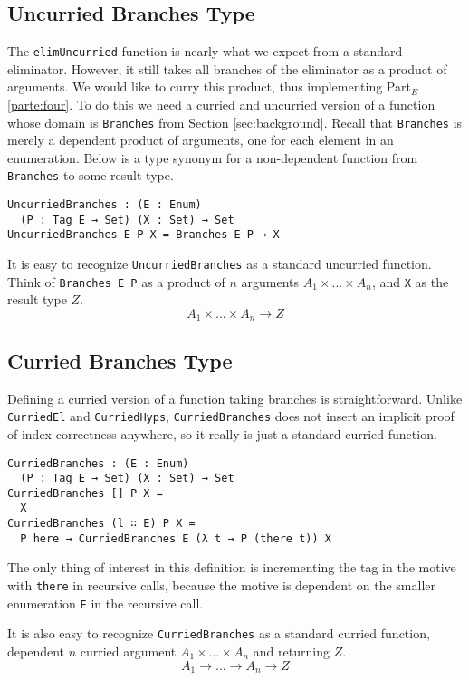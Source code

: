 \documentclass[preprint,nonatbib]{sigplanconf}
\newcommand{\refsec}[1]{Section \ref{sec:#1}}
\newcommand{\refparte}[1]{Part$_E$ \ref{parte:#1}}
\begin{document}
\subsection{Uncurried Branches Type}

The {\tt elimUncurried} function is nearly what we expect from a
standard eliminator. However, it still takes all branches of the
eliminator as a product of arguments. We would like to curry this
product, thus implementing \refparte{four}.
To do this we need a curried and uncurried
version of a function whose domain is {\tt Branches}
from \refsec{background}. Recall that {\tt Branches} is merely a
dependent product of arguments, one for each element in an
enumeration. Below is a type synonym for a non-dependent function from
{\tt Branches} to some result type.

\begin{verbatim}
UncurriedBranches : (E : Enum)
  (P : Tag E → Set) (X : Set) → Set
UncurriedBranches E P X = Branches E P → X
\end{verbatim}

It is easy to recognize {\tt UncurriedBranches} as a standard
uncurried function. Think of {\tt Branches E P} as a product of
$n$ arguments $A_1 × ... × A_n$, 
and {\tt X} as the result type $Z$.
\[
A_1 × ... × A_n → Z
\]

\subsection{Curried Branches Type}

Defining a curried version of a function taking branches is
straightforward. Unlike {\tt CurriedEl} and {\tt CurriedHyps},
{\tt CurriedBranches} does not insert an implicit proof of index
correctness anywhere, so it really is just a standard curried
function.

\begin{verbatim}
CurriedBranches : (E : Enum)
  (P : Tag E → Set) (X : Set) → Set
CurriedBranches [] P X =
  X
CurriedBranches (l ∷ E) P X =
  P here → CurriedBranches E (λ t → P (there t)) X
\end{verbatim}

The only thing of interest in this definition is incrementing the tag
in the motive with {\tt there} in recursive calls, because the motive
is dependent on the smaller enumeration {\tt E} in the recursive call.

It is also easy to recognize {\tt CurriedBranches} as a standard
curried function, dependent $n$ curried argument $A_1 × ... × A_n$ and
returning $Z$.
\[
A_1 → ... → A_n → Z
\]
\end{document}
